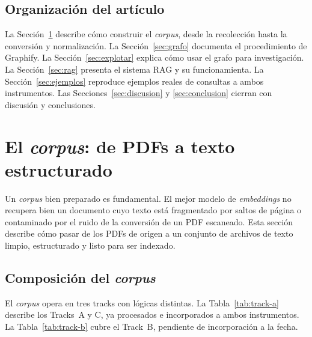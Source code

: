 \documentclass[12pt,a4paper]{article}
\begin{document}

\subsection{Organización del artículo}

La Sección~\ref{sec:corpus} describe cómo construir el \textit{corpus}, desde la recolección hasta la 
conversión y normalización. La Sección~\ref{sec:grafo} documenta el procedimiento
de Graphify. La Sección~\ref{sec:explotar} explica cómo usar el grafo para
investigación. La Sección~\ref{sec:rag} presenta el sistema RAG y su funcionamienta. 
La Sección~\ref{sec:ejemplos} reproduce ejemplos reales de
consultas a ambos instrumentos. Las Secciones~\ref{sec:discusion} y
\ref{sec:conclusion} cierran con discusión y conclusiones.

\section{El \textit{corpus}: de PDFs a texto estructurado}
\label{sec:corpus}

Un \textit{corpus} bien preparado es fundamental. El mejor modelo de
\textit{embeddings} no recupera bien un documento cuyo texto está fragmentado por saltos
de página o contaminado por el ruido de la conversión de un PDF escaneado. Esta
sección describe cómo pasar de los PDFs de origen a un conjunto de archivos de
texto limpio, estructurado y listo para ser indexado.

\subsection{Composición del \textit{corpus}}

El \textit{corpus} opera en tres tracks con lógicas distintas. La Tabla~\ref{tab:track-a}
describe los Tracks~A y C, ya procesados e incorporados a ambos instrumentos.
La Tabla~\ref{tab:track-b} cubre el Track~B, pendiente de incorporación a la fecha.
\end{document}
